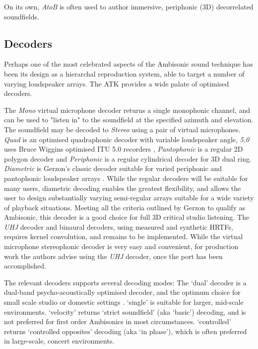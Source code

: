 \documentclass{article}
\begin{document}
On its own, \emph{AtoB} is often used to author immersive, periphonic (3D) decorrelated soundfields.




\subsection{Decoders}\label{sec:decoders}

Perhaps one of the most celebrated aspects of the Ambisonic sound technique has been its design as a hierarchal reproduction system, able to target a number of varying loudspeaker arrays.
The ATK provides a wide palate of optimised decoders.

The \emph{Mono} virtual microphone decoder returns a single monophonic channel, and can be used to "listen in" to the soundfield at the specified azimuth and elevation.
The soundfield may be decoded to \emph{Stereo} using a pair of virtual microphones.
\emph{Quad} is an optimised quadraphonic decoder with variable loudspeaker angle, \emph{5.0} uses Bruce Wiggins optimised ITU 5.0 recorders \cite{wiggins:2003optimised}, \emph{Pantophonic} is a regular 2D polygon decoder and \emph{Periphonic} is a regular cylindrical decoder for 3D dual ring.
\emph{Diametric} is Gerzon's classic decoder suitable for varied periphonic and pantophonic loudspeaker arrays \cite{gerzon:1980sphere}.
While the regular decoders will be suitable for many users, diametric decoding enables the greatest flexibility, and allows the user to design substantially varying semi-regular arrays suitable for a wide variety of playback situations.
Meeting all the criteria outlined by Gerzon to qualify as Ambisonic, this decoder is a good choice for full 3D critical studio listening.
The \emph{UHJ} decoder and binaural decoders, using measured and synthetic HRTFs, requires kernel convolution, and remains to be implemented.
While the virtual microphone stereophonic decoder is very easy and convenient, for production work the authors advise using the \emph{UHJ} decoder, once the port has been accomplished.

The relevant decoders supports several decoding modes: 
The `dual' decoder is a dual-band psycho-acoustically optimised decoder, and the optimum choice for small scale studio or domestic settings \cite{heller:2008isAmbisonic}.
`single' is suitable for larger, mid-scale environments.
`velocity' returns `strict soundfield' (aka `basic') decoding, and is not preferred for first order Ambisonics in most circumstances.
`controlled' returns `controlled opposites' decoding (aka `in phase'), which is often preferred in large-scale, concert environments.
\end{document}
